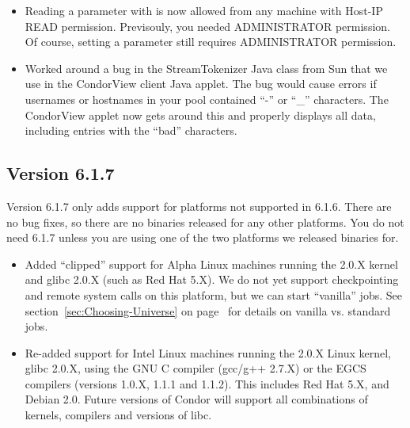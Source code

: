 \begin{itemize}
\item Reading a parameter with  is now allowed from any
machine with Host-IP READ permission.
Previsouly, you needed ADMINISTRATOR permission.  
Of course, setting a parameter still requires ADMINISTRATOR permission.

\item Worked around a bug in the StreamTokenizer Java class from Sun
that we use in the CondorView client Java applet.
The bug would cause errors if usernames or hostnames in your pool
contained ``-'' or ``\_'' characters.
The CondorView applet now gets around this and properly displays all
data, including entries with the ``bad'' characters.

\end{itemize}

\subsection{\label{sec:New-6-1-7}Version 6.1.7}

\Note Version 6.1.7 only adds support for platforms not supported in
6.1.6.  
There are no bug fixes, so there are no binaries released for any
other platforms. 
You do not need 6.1.7 unless you are using one of the two platforms we
released binaries for.

\begin{itemize}

\item Added ``clipped'' support for Alpha Linux machines running the
2.0.X kernel and glibc 2.0.X (such as Red Hat 5.X).
We do not yet support checkpointing and remote system calls on this
platform, but we can start ``vanilla'' jobs.
See section~\ref{sec:Choosing-Universe} on
page~\pageref{sec:Choosing-Universe} for details on vanilla
vs. standard jobs.

\item Re-added support for Intel Linux machines running the 2.0.X
Linux kernel, glibc 2.0.X, using the GNU C compiler (gcc/g++ 2.7.X) or
the EGCS compilers (versions 1.0.X, 1.1.1 and 1.1.2).
This includes Red Hat 5.X, and Debian 2.0.
Future versions of Condor will support all combinations of kernels,
compilers and versions of libc.

\end{itemize}


